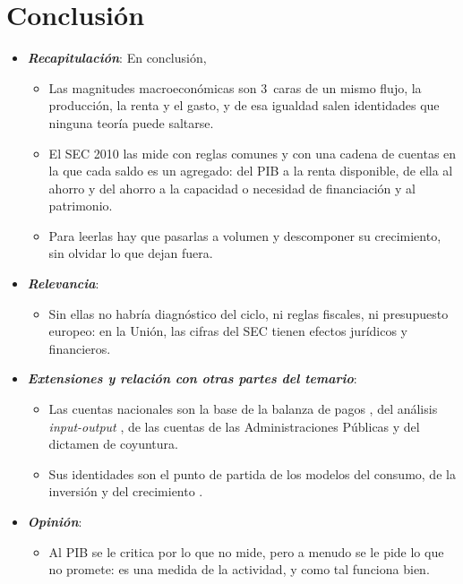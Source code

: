 \documentclass[11pt]{article}
\begin{document}
\section*{Conclusión}

\begin{itemize}
\item \textbf{\emph{Recapitulación}}: En conclusión,
  \begin{itemize}
  \item Las magnitudes macroeconómicas son 3~caras de un mismo flujo, la producción, la renta y el gasto, y de esa igualdad salen identidades que ninguna teoría puede saltarse.
  \item El SEC 2010 las mide con reglas comunes y con una cadena de cuentas en la que cada saldo es un agregado: del PIB a la renta disponible, de ella al ahorro y del ahorro a la capacidad o necesidad de financiación y al patrimonio.
  \item Para leerlas hay que pasarlas a volumen y descomponer su crecimiento, sin olvidar lo que dejan fuera.
  \end{itemize}
\item \textbf{\emph{Relevancia}}:
  \begin{itemize}
  \item Sin ellas no habría diagnóstico del ciclo, ni reglas fiscales, ni presupuesto europeo: en la Unión, las cifras del SEC tienen efectos jurídicos y financieros.
  \end{itemize}
\item \textbf{\emph{Extensiones y relación con otras partes del temario}}:
  \begin{itemize}
  \item Las cuentas nacionales son la base de la balanza de pagos , del análisis \emph{input-output} , de las cuentas de las Administraciones Públicas  y del dictamen de coyuntura.
  \item Sus identidades son el punto de partida de los modelos del consumo, de la inversión y del crecimiento   .
  \end{itemize}
\item \textbf{\emph{Opinión}}:
  \begin{itemize}
  \item Al PIB se le critica por lo que no mide, pero a menudo se le pide lo que no promete: es una medida de la actividad, y como tal funciona bien.

\end{itemize}
\end{itemize}
\end{document}
